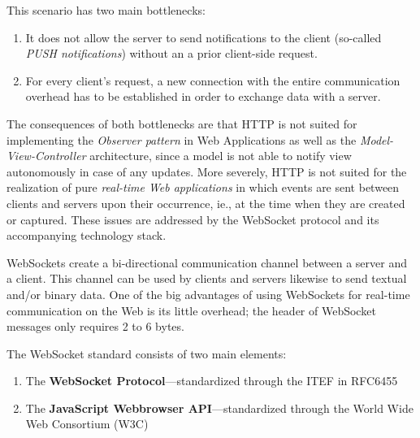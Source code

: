 \documentclass[a4paper, justified, notoc]{tufte-handout} %
\newcommand{\note}[1] {
	\marginnote{\textbf{Note:}\quad #1 } }
\begin{document}
This scenario has two main bottlenecks:
\begin{enumerate}
	\item It does not allow the server to send notifications to the client (so-called \emph{PUSH notifications}) without an a prior client-side request.
	\item For every client's request, a new connection with the entire communication overhead has to be established in order to exchange data with a server.
\end{enumerate}

The consequences of both bottlenecks are that HTTP is not suited for implementing the \emph{Observer pattern} in Web Applications as well as the \emph{Model-View-Controller} architecture, since a model is not able to notify view autonomously in case of any updates. More severely, HTTP is not suited for the realization of pure \emph{real-time Web applications} in which events are sent between clients and servers upon their occurrence, ie., at the time when they are created or captured. 
These issues are addressed by the WebSocket protocol and its accompanying technology stack.

WebSockets create a bi-directional communication channel between a server and a client. This channel can be used by clients and servers likewise to send textual and/or binary data. 
One of the big advantages of using WebSockets for real-time communication on the Web is its little overhead; the header of WebSocket messages only requires 2 to 6 bytes. 

The WebSocket standard consists of two main elements:
\begin{enumerate}
	\item The \textbf{WebSocket Protocol}---standardized through the ITEF in RFC6455
	\item The \textbf{JavaScript Webbrowser API}---standardized through the World Wide Web Consortium (W3C) 
\end{enumerate}

\end{document}
